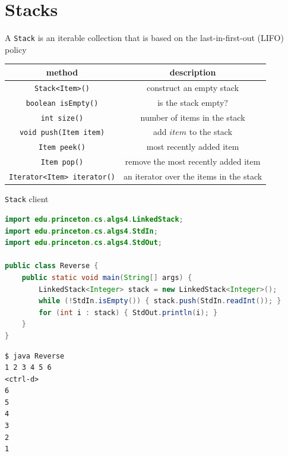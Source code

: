 \documentclass[8pt,a4paper,compress]{beamer}
\begin{document}
\section{Stacks}
\begin{frame}[fragile]
\pause

A \lstinline{Stack} is an iterable collection that is based on the last-in-first-out (LIFO) policy

\begin{center}
\begin{tabular}{cc}
method & description \\ \hline
\lstinline$Stack<Item>()$ & construct an empty stack \\
\lstinline$boolean isEmpty()$ & is the stack empty? \\
\lstinline$int size()$ & number of items in the stack \\
\lstinline$void push(Item item)$ & add $item$ to the stack \\
\lstinline$Item peek()$ & most recently added item \\
\lstinline$Item pop()$ & remove the most recently added item \\
\lstinline$Iterator<Item> iterator()$ & an iterator over the items in the stack
\end{tabular} 
\end{center}
\end{frame}

\begin{frame}[fragile]
\pause

\lstinline{Stack} client

\smallskip

\begin{lstlisting}[language=Java,style=focusin]
import edu.princeton.cs.algs4.LinkedStack;
import edu.princeton.cs.algs4.StdIn;
import edu.princeton.cs.algs4.StdOut;

public class Reverse {
    public static void main(String[] args) {
        LinkedStack<Integer> stack = new LinkedStack<Integer>();
        while (!StdIn.isEmpty()) { stack.push(StdIn.readInt()); }
        for (int i : stack) { StdOut.println(i); }
    }
}
\end{lstlisting}

\pause\bigskip

\begin{lstlisting}[language={},style=focusin]
$ java Reverse 
1 2 3 4 5 6
<ctrl-d>
6
5
4
3
2
1
\end{lstlisting}
\end{frame}
\end{document}
